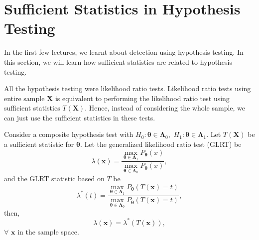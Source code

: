 \documentclass[a4paper,english,12pt]{article}
\newcommand{\bx}{\mathbf{x}}
\newcommand{\bX}{\mathbf{X}}
\newcommand{\btheta}{\boldsymbol{\theta}}
\newcommand{\bLambda}{\boldsymbol{\Lambda}}
\begin{document}
\section{Sufficient Statistics in Hypothesis Testing}
In the first few lectures, we learnt about detection using hypothesis testing. In this section, we will learn how sufficient statistics are related to hypothesis testing.
\par All the hypothesis testing were likelihood ratio tests. Likelihood ratio tests using entire sample $\bX$ is equivalent to performing the likelihood ratio test using sufficient statistics $T(\bX)$. Hence, instead of considering the whole sample, we can just use the sufficient statistics in these tests.
\begin{thm}
Consider a composite hypothesis test with $H_0:\btheta\in{\bLambda}_0$,~$H_1:\btheta\in{\bLambda}_1$. Let $T(\bX)$ be a sufficient statistic for $\btheta$. Let the generalized likelihood ratio test (GLRT) be 
\begin{equation}
\lambda(\bx) =\dfrac{\displaystyle\max_{\btheta\in{\bLambda}_1} P_{\btheta}(x)}{\displaystyle\max_{\btheta\in{\bLambda}_0} P_{\btheta}(x)},
\end{equation}
and the GLRT statistic based on $T$ be
\begin{equation}
\lambda^*(t) =\dfrac{\displaystyle\max_{\btheta\in{\bLambda}_1} P_{\btheta}(T(\bx)=t)}{\displaystyle\max_{\btheta\in{\bLambda}_0} P_{\btheta}(T(\bx)=t)},
\end{equation}
then, 
\begin{equation}
\lambda(\bx) = \lambda^*(T(\bx)), 
\end{equation}
$\forall$ $\bx$ in the sample space.
\end{thm}
\end{document}
